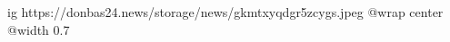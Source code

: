  
 
 
 
 

\ifcmt
  ig https://donbas24.news/storage/news/gkmtxyqdgr5zcygs.jpeg
  @wrap center
  @width 0.7
\fi
